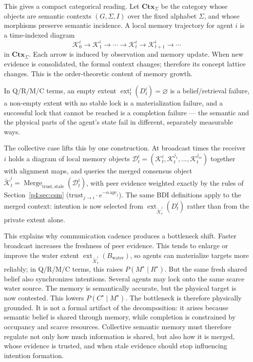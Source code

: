 \documentclass{article}
\begin{document}
This gives a compact categorical reading. Let $\mathbf{Ctx}_\Sigma$ be
the category whose objects are semantic contexts $(G,\Sigma,I)$ over the
fixed alphabet $\Sigma$, and whose morphisms preserve semantic
incidence. A local memory trajectory for agent $i$ is a time-indexed
diagram
\[
\mathcal{K}_0^i\rightarrow\mathcal{K}_1^i\rightarrow\cdots
\rightarrow\mathcal{K}_t^i\rightarrow\mathcal{K}_{t+1}^i\rightarrow\cdots
\]
in $\mathbf{Ctx}_\Sigma$. Each arrow is induced by observation and
memory update. When new evidence is consolidated, the formal context
changes; therefore its concept lattice changes. This is the
order-theoretic content of memory growth.

In Q/R/M/C terms, an empty extent
$\operatorname{ext}_t^i(D_t^i)=\varnothing$ is a belief/retrieval
failure, a non-empty extent with no stable lock is a materialization
failure, and a successful lock that cannot be reached is a completion
failure --- the semantic and the physical parts of the agent's state
fail in different, separately measurable ways.

The collective case lifts this by one construction. At broadcast times
the receiver $i$ holds a diagram of local memory objects
$\mathcal{D}_t^i=(\mathcal{K}_t^i,\mathcal{K}_t^{j_1},\ldots,
\mathcal{K}_t^{j_m})$ together with alignment maps, and queries the
merged consensus object
$\widetilde{\mathcal{K}}_t^i=\operatorname{Merge}_{\mathrm{trust},
\mathrm{stale}}(\mathcal{D}_t^i)$, with peer evidence weighted exactly
by the rules of Section~\ref{p4:sec:csm}
($\mathrm{trust}_{j\to i}\cdot e^{-\alpha\,\mathrm{age}_j}$). The same
BDI definitions apply to the merged context: intention is now selected
from $\operatorname{ext}_{\widetilde{\mathcal{K}}_t^i}(D_t^i)$ rather
than from the private extent alone.

This explains why communication cadence produces a bottleneck shift.
Faster broadcast increases the freshness of peer evidence. This tends
to enlarge or improve the water extent
$\operatorname{ext}_{\widetilde{\mathcal{K}}_t^i}(B_{\mathrm{water}})$,
so agents can materialize targets more reliably; in Q/R/M/C terms, this
raises $P(M^\star\mid R^\star)$. But the same fresh shared belief also
synchronizes intentions. Several agents may lock onto the same scarce
water source. The memory is semantically accurate, but the physical
target is now contested. This lowers $P(C^\star\mid M^\star)$. The
bottleneck is therefore physically grounded. It is not a formal
artifact of the decomposition: it arises because semantic belief is
shared through memory, while completion is constrained by occupancy and
scarce resources. Collective semantic memory must therefore regulate
not only how much information is shared, but also how it is merged,
whose evidence is trusted, and when stale evidence should stop
influencing intention formation.
\end{document}
